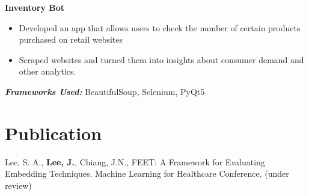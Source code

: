 \documentclass[a4paper,10pt]{article}
\begin{document}
\hspace{-5.5mm}\textbf{Inventory Bot} \href{https://github.com/tmdgjs2592/inventory_bot}{\faGithub }
\begin{itemize}
    \item Developed an app that allows users to check the number of certain products purchased on retail websites
    \item Scraped websites and turned them into insights about consumer demand and other analytics. 
\end{itemize}
\textbf{\textit{Frameworks Used:}} BeautifulSoup, Selenium, PyQt5  \\




\section*{Publication}
Lee, S. A., \textbf{Lee, J.}, Chiang, J.N., FEET: A Framework for Evaluating Embedding Techniques. Machine Learning for Healthcare Conference. (under review)



\end{document}
